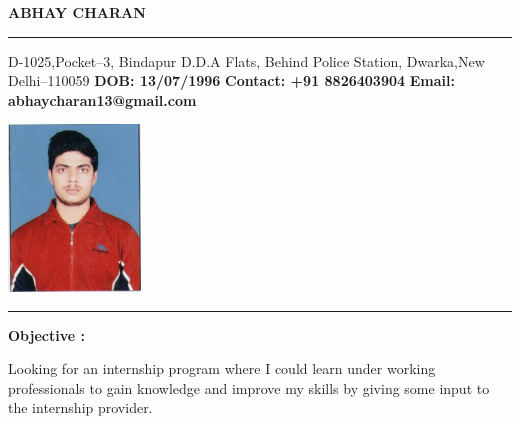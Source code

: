 \documentclass[11pt,a4paper]{article}
\begin{document}
\begin{center}
\begin{large}
\textbf{ABHAY CHARAN}
\end{large}
\end{center}
\hrule
\begin{multicols}{2}
	\begin{minipage}{.4\paperwidth}
		\begin{flushleft}
			\hfill
			\linebreak
			\hfill
			\linebreak
			D-1025,Pocket--3,
			\linebreak
			Bindapur D.D.A Flats,
			\linebreak
			Behind Police Station,
			\linebreak
			Dwarka,New Delhi--110059
			\linebreak
			\hfill
			\linebreak
			\textbf{DOB: 13/07/1996}
			\linebreak
			\textbf{Contact: +91 8826403904}
			\linebreak
			\textbf{Email: abhaycharan13@gmail.com}
		\end{flushleft}
	\end{minipage}
	\begin{minipage}{.4\paperwidth}
		\begin{flushright}
			\includegraphics[width=100pt]{"abhayphoto"}
		\end{flushright}
	\end{minipage}
\end{multicols}
\hrule
\begin{multicols}{2}
	\begin{minipage}{0.15\paperwidth}
		\textbf{Objective :}
	\end{minipage}
	\begin{minipage}{0.7\paperwidth}
		Looking for an internship program where I could learn under working professionals to gain knowledge and improve my skills by giving some input to the internship provider.
	\end{minipage}
\end{multicols}
\end{document}
